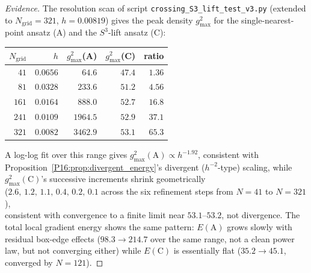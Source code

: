 \documentclass[11pt,a4paper]{article}
\theoremstyle{definition}\newtheorem{definition}[theorem]{Definition}
\theoremstyle{remark}
\theoremstyle{definition}\newtheorem{construction}[theorem]{Construction}
\begin{document}
\begin{proof}[Evidence]
The resolution scan of script \texttt{crossing\_S3\_lift\_test\_v3.py}
(extended to $N_{\mathrm{grid}}=321$, $h=0.00819$) gives the peak
density $g^2_{\max}$ for the single-nearest-point ansatz (A) and the
$S^3$-lift ansatz (C):
\begin{center}
\renewcommand{\arraystretch}{1.2}
\begin{tabular}{rrrrr}
\toprule
$N_{\mathrm{grid}}$ & $h$ & $g^2_{\max}$(A) & $g^2_{\max}$(C) & ratio \\
\midrule
$41$  & $0.0656$ & $64.6$   & $47.4$ & $1.36$ \\
$81$  & $0.0328$ & $233.6$  & $51.2$ & $4.56$ \\
$161$ & $0.0164$ & $888.0$  & $52.7$ & $16.8$ \\
$241$ & $0.0109$ & $1964.5$ & $52.9$ & $37.1$ \\
$321$ & $0.0082$ & $3462.9$ & $53.1$ & $65.3$ \\
\bottomrule
\end{tabular}
\end{center}
A log-log fit over this range gives
$g^2_{\max}(\mathrm{A})\propto h^{-1.92}$, consistent with
Proposition~\ref{P16:prop:divergent_energy}'s divergent
($h^{-2}$-type) scaling, while $g^2_{\max}(\mathrm{C})$'s successive
increments shrink geometrically\\
($2.6,\,1.2,\,1.1,\,0.4,\,0.2,\,0.1$
across the six refinement steps from $N=41$ to $N=321$),\\
consistent with convergence to a finite limit near $53.1$--$53.2$, not
divergence. The total local gradient energy shows the same pattern:
$E(\mathrm{A})$ grows slowly with residual box-edge effects
($98.3\to214.7$ over the same range, not a clean power law, but not
converging either) while $E(\mathrm{C})$ is essentially flat
($35.2\to45.1$, converged by $N=121$).
\end{proof}
\end{document}
